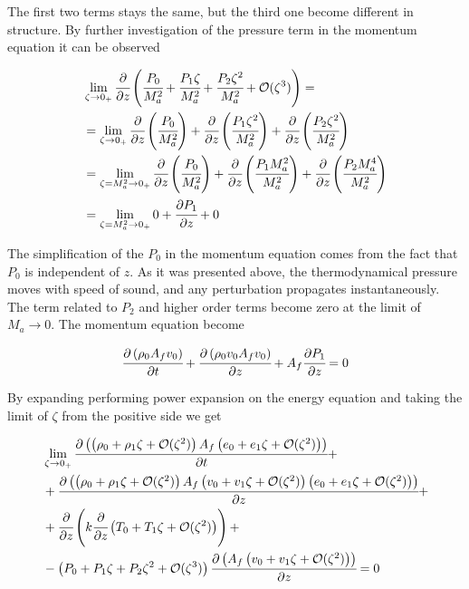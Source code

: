 \documentclass[../Article_Model_Parameters.tex]{subfiles}
\begin{document}
	The first two terms stays the same, but the third one become different in structure. By further investigation of the pressure term in the momentum equation it can be observed
	
	{\footnotesize
		\begin{align*}
			& \lim_{\zeta \rightarrow 0_+} \cfrac{\partial }{\partial z} \left(  \cfrac{P_0}{M_a^2}	+ \cfrac{P_1 \zeta}{M_a^2}	+ \cfrac{P_2 \zeta^2}{M_a^2} + \mathcal{O}(\zeta^3) \right) = \\
			& = \lim_{\zeta \rightarrow 0_+} \cfrac{\partial }{\partial z} \left(  \cfrac{P_0}{M_a^2} \right) + \cfrac{\partial }{\partial z} \left(  \cfrac{P_1 \zeta^2}{M_a^2} \right) + \cfrac{\partial }{\partial z} \left(  \cfrac{P_2 \zeta^2}{M_a^2} \right) \\
			& = \lim_{\zeta=M_a^2 \rightarrow 0_+} \cfrac{\partial }{\partial z} \left(  \cfrac{P_0}{M_a^2} \right) + \cfrac{\partial }{\partial z} \left(  \cfrac{P_1 M_a^2}{M_a^2} \right) + \cfrac{\partial }{\partial z} \left(  \cfrac{P_2 M_a^4}{M_a^2} \right) \\
			& = \lim_{\zeta=M_a^2 \rightarrow 0_+} 0 + \cfrac{\partial P_1}{\partial z}  + 0 \\
		\end{align*}
	}

	The simplification of the $P_0$ in the momentum equation comes from the fact that $P_0$ is independent of $z$. As it was presented above, the thermodynamical pressure moves with speed of sound, and any perturbation propagates instantaneously. The term related to $P_2$ and higher order terms become zero at the limit of $M_a \rightarrow 0$. The momentum equation become
	
	{\footnotesize
		\begin{equation*}
			\cfrac{\partial \left( \rho_0 A_f v_0 \right) }{\partial t}	+ \cfrac{\partial \left( \rho_0 v_0 A_f v_0 \right)}{\partial z} + A_f \cfrac{\partial P_1}{\partial z} = 0
		\end{equation*}
	}

	By expanding performing power expansion on the energy equation and taking the limit of $\zeta$ from the positive side we get
	
	{\footnotesize
		\begin{align*}
			& \lim_{\zeta \rightarrow 0_+} \cfrac{\partial \left( \left( \rho_0	+ \rho_1 \zeta	+ \mathcal{O}(\zeta^2) \right) A_f \left( e_0	+ e_1 \zeta 	+ \mathcal{O}(\zeta^2) \right) \right)}{\partial t} + \\
			&+ \cfrac{\partial \left(  \left(  \rho_0	+ \rho_1 \zeta	+ \mathcal{O}(\zeta^2) \right) A_f \left( v_0	+ v_1 \zeta 	+ \mathcal{O}(\zeta^2) \right) \left( e_0	+ e_1 \zeta 	+ \mathcal{O}(\zeta^2) \right) \right) }{\partial z} + \\
			&+ \cfrac{\partial}{\partial z} \left( k \cfrac{\partial }{\partial z} \left( T_0 	+ T_1 \zeta 	+ \mathcal{O}(\zeta^2) \right) \right) + \\
			&- \left(  P_0 	+ P_1 \zeta		+ P_2 \zeta^2 		+ \mathcal{O}(\zeta^3)  \right) \cfrac{\partial \left( A_f \left( v_0 + v_1 \zeta + \mathcal{O}(\zeta^2) \right) \right) }{\partial z} = 0
		\end{align*}
	}
	
\end{document}
